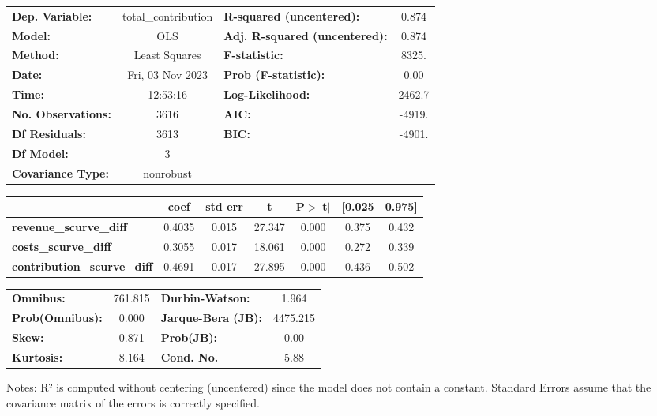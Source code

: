 \begin{center}
\begin{tabular}{lclc}
\toprule
\textbf{Dep. Variable:}             & total\_contribution & \textbf{  R-squared (uncentered):}      &     0.874   \\
\textbf{Model:}                     &         OLS         & \textbf{  Adj. R-squared (uncentered):} &     0.874   \\
\textbf{Method:}                    &    Least Squares    & \textbf{  F-statistic:       }          &     8325.   \\
\textbf{Date:}                      &   Fri, 03 Nov 2023  & \textbf{  Prob (F-statistic):}          &     0.00    \\
\textbf{Time:}                      &       12:53:16      & \textbf{  Log-Likelihood:    }          &    2462.7   \\
\textbf{No. Observations:}          &          3616       & \textbf{  AIC:               }          &    -4919.   \\
\textbf{Df Residuals:}              &          3613       & \textbf{  BIC:               }          &    -4901.   \\
\textbf{Df Model:}                  &             3       & \textbf{                     }          &             \\
\textbf{Covariance Type:}           &      nonrobust      & \textbf{                     }          &             \\
\bottomrule
\end{tabular}
\begin{tabular}{lcccccc}
                                    & \textbf{coef} & \textbf{std err} & \textbf{t} & \textbf{P$> |$t$|$} & \textbf{[0.025} & \textbf{0.975]}  \\
\midrule
\textbf{revenue\_scurve\_diff}      &       0.4035  &        0.015     &    27.347  &         0.000        &        0.375    &        0.432     \\
\textbf{costs\_scurve\_diff}        &       0.3055  &        0.017     &    18.061  &         0.000        &        0.272    &        0.339     \\
\textbf{contribution\_scurve\_diff} &       0.4691  &        0.017     &    27.895  &         0.000        &        0.436    &        0.502     \\
\bottomrule
\end{tabular}
\begin{tabular}{lclc}
\textbf{Omnibus:}       & 761.815 & \textbf{  Durbin-Watson:     } &    1.964  \\
\textbf{Prob(Omnibus):} &   0.000 & \textbf{  Jarque-Bera (JB):  } & 4475.215  \\
\textbf{Skew:}          &   0.871 & \textbf{  Prob(JB):          } &     0.00  \\
\textbf{Kurtosis:}      &   8.164 & \textbf{  Cond. No.          } &     5.88  \\
\bottomrule
\end{tabular}
\end{center}

Notes: \newline
 [1] R² is computed without centering (uncentered) since the model does not contain a constant. \newline
 [2] Standard Errors assume that the covariance matrix of the errors is correctly specified.